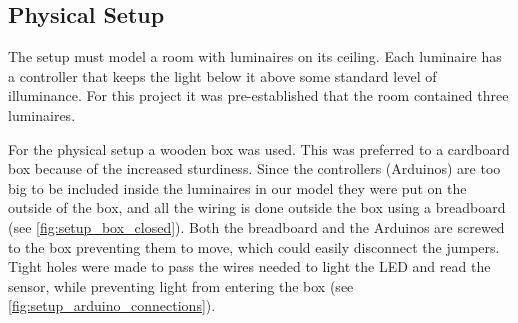 \subsection{Physical Setup}
\label{sec:PhysicalSetup}


The setup must model a room with luminaires on its ceiling. Each luminaire has a controller that keeps the light below it above some standard level of illuminance. For this project it was pre-established that the room contained three luminaires.

For the physical setup a wooden box was used. This was preferred to a cardboard box because of the increased sturdiness. Since the controllers (Arduinos) are too big to be included inside the luminaires in our model they were put on the outside of the box,  and all the wiring is done outside the box using a breadboard (see \autoref{fig:setup_box_closed}). Both the breadboard and the Arduinos are screwed to the box preventing them to move, which could easily disconnect the jumpers. Tight holes were made to pass the wires needed to light the LED and read the sensor, while preventing light from entering the box (see \autoref{fig:setup_arduino_connections}).

